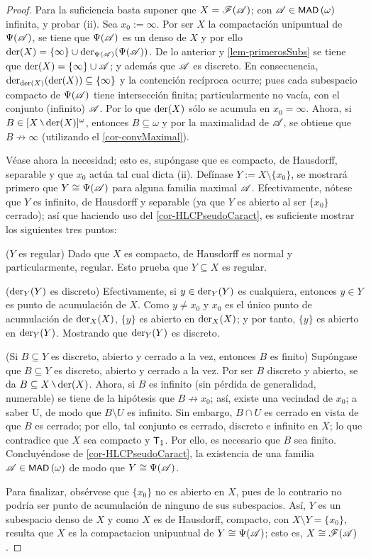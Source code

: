 	\begin{proof} 
		Para la suficiencia basta suponer que $X=\mathscr{F}(\mathscr{A})$; con $\mathscr{A} \in \operatorname{\text{\textsf{\small MAD}}}\,(\omega)$ infinita, y probar (ii). Sea $x_0:=\infty$. Por ser $X$ la compactación unipuntual de $\Psi(\mathscr{A})$, se tiene que $\Psi(\mathscr{A})$ es un denso de $X$ y por ello $\operatorname{der}(X) = \{\infty\} \cup \operatorname{der}_{\Psi(\mathscr{A})}(\Psi(\mathscr{A}))$. De lo anterior y \ref{lem-primerosSubs} se tiene que $\operatorname{der}(X) = \{\infty\} \cup \mathscr{A}$; y además que $\mathscr{A}$ es discreto. En consecuencia, $\operatorname{der}_{\operatorname{der}(X)}(\operatorname{der}(X)) \subseteq \{\infty\}$ y la contención recíproca ocurre; pues cada subespacio compacto de $\Psi(\mathscr{A})$ tiene intersección finita; particularmente no vacía, con el conjunto (infinito) $\mathscr{A}$. Por lo que $\operatorname{der}(X)$ sólo se acumula en $x_0=\infty$. Ahora, si $B \in [X \setminus \der(X)]^\omega$, entonces $B \subseteq \omega$ y por la maximalidad de $\mathscr{A}$, se obtiene que $B \not\to \infty$ (utilizando el \autoref{cor-convMaximal}).

		Véase ahora la necesidad; esto es, supóngase que es compacto, de Hausdorff, separable y que $x_0$ actúa tal cual dicta (ii). Defínase $Y:=X\setminus \{x_0\}$, se mostrará primero que $Y \cong \Psi(\mathscr{A})$ para alguna familia maximal $\mathscr{A}$. Efectivamente, nótese que $Y$ es infinito, de Hausdorff y separable (ya que $Y$ es abierto al ser $\{x_0\}$ cerrado); así que haciendo uso del \autoref{cor-HLCPseudoCaract}, es suficiente mostrar los siguientes tres puntos:

		($Y$ es regular) Dado que $X$ es compacto, de Hausdorff es normal y particularmente, regular. Esto prueba que $Y \subseteq X$ es regular.

		($\operatorname{der}_Y(Y)$ es discreto) Efectivamente, si $y \in \operatorname{der}_Y(Y)$ es cualquiera, entonces $y \in Y$ es punto de acumulación de $X$. Como $y \neq x_0$ y $x_0$ es el único punto de acumulación de $\operatorname{der}_X(X)$, $\{y\}$ es abierto en $\operatorname{der}_X(X)$; y por tanto, $\{y\}$ es abierto en $\operatorname{der}_Y(Y)$. Mostrando que $\operatorname{der}_Y(Y)$ es discreto.

		(Si $B \subseteq Y$ es discreto, abierto y cerrado a la vez, entonces $B$ es finito) Supóngase que $B \subseteq Y$ es discreto, abierto y cerrado a la vez. Por ser $B$ discreto y abierto, se da $B \subseteq X \setminus \der(X)$. Ahora, si $B$ es infinito (sin pérdida de generalidad, numerable) se tiene de la hipótesis que $B \not\to x_0$; así, existe una vecindad de $x_0$; a saber U, de modo que $B \setminus U$ es infinito. Sin embargo, $B \cap U$ es cerrado en vista de que $B$ es cerrado; por ello, tal conjunto es cerrado, discreto e infinito en $X$; lo que contradice que $X$ sea compacto y $\text{\textsf{\small T}}_1$. Por ello, es necesario que $B$ sea finito. Concluyéndose de \ref{cor-HLCPseudoCaract}, la existencia de una familia $\mathscr{A}\in\operatorname{\text{\textsf{\small MAD}}}\,(\omega)$ de modo que $Y \cong \Psi(\mathscr{A})$.

		Para finalizar, obsérvese que $\{x_0\}$ no es abierto en $X$, pues de lo contrario no podría ser punto de acumulación de ninguno de sus subespacios. Así, $Y$ es un subespacio denso de $X$ y como $X$ es de Hausdorff, compacto, con $X \setminus Y = \{x_0\}$, resulta que $X$ es la compactacion unipuntual de $Y \cong \Psi(\mathscr{A})$; esto es, $X \cong \mathscr{F}(\mathscr{A})$.
	\end{proof}

